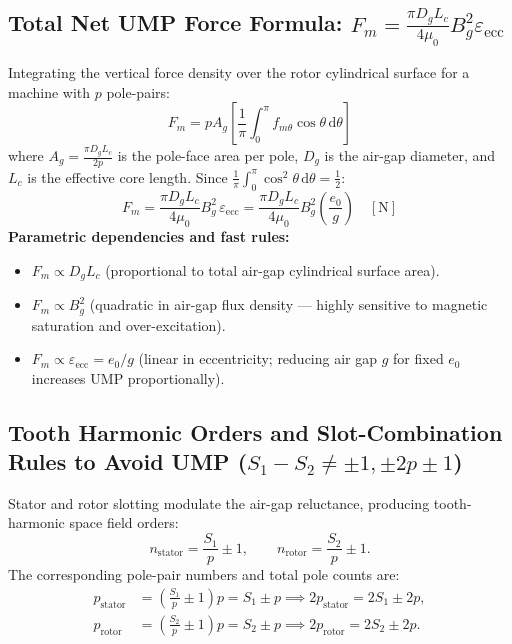 \subsection{Total Net UMP Force Formula: \texorpdfstring{$F_m = \frac{\pi D_g L_c}{4\mu_0} B_g^2 \varepsilon_{\mathrm{ecc}}$}{Fm = (pi Dg Lc / 4 mu0) Bg2 eps(ecc)}}
Integrating the vertical force density over the rotor cylindrical surface for a machine with $p$ pole-pairs:
\begin{equation}
F_m = p A_g\left[\frac{1}{\pi}\int_0^\pi f_{m\theta}\cos\theta\,\mathrm{d}\theta\right]
\end{equation}
where $A_g = \frac{\pi D_g L_c}{2p}$ is the pole-face area per pole, $D_g$ is the air-gap diameter, and $L_c$ is the effective core length.
Since $\frac{1}{\pi}\int_0^\pi \cos^2\theta\,\mathrm{d}\theta = \frac{1}{2}$:
\begin{equation}
\boxed{F_m = \frac{\pi D_g L_c}{4\mu_0} B_g^2\,\varepsilon_{\mathrm{ecc}} = \frac{\pi D_g L_c}{4\mu_0} B_g^2\left(\frac{e_0}{g}\right) \quad [\mathrm{N}]}
\end{equation}
\textbf{Parametric dependencies and fast rules:}
\begin{itemize}
  \item $F_m \propto D_g L_c$ (proportional to total air-gap cylindrical surface area).
  \item $F_m \propto B_g^2$ (quadratic in air-gap flux density --- highly sensitive to magnetic saturation and over-excitation).
  \item $F_m \propto \varepsilon_{\mathrm{ecc}} = e_0/g$ (linear in eccentricity; reducing air gap $g$ for fixed $e_0$ increases UMP proportionally).
\end{itemize}

\subsection{Tooth Harmonic Orders and Slot-Combination Rules to Avoid UMP (\texorpdfstring{$S_1 - S_2 \neq \pm 1, \pm 2p \pm 1$}{S1 - S2 != +/-1, +/-2p+/-1})}
Stator and rotor slotting modulate the air-gap reluctance, producing tooth-harmonic space field orders:
\begin{equation}
n_{\mathrm{stator}} = \frac{S_1}{p}\pm 1, \qquad n_{\mathrm{rotor}} = \frac{S_2}{p}\pm 1.
\end{equation}
The corresponding pole-pair numbers and total pole counts are:
\begin{align}
p_{\mathrm{stator}} &= \left(\frac{S_1}{p}\pm 1\right)p = S_1 \pm p \implies 2p_{\mathrm{stator}} = 2S_1 \pm 2p, \\
p_{\mathrm{rotor}} &= \left(\frac{S_2}{p}\pm 1\right)p = S_2 \pm p \implies 2p_{\mathrm{rotor}} = 2S_2 \pm 2p.
\end{align}

